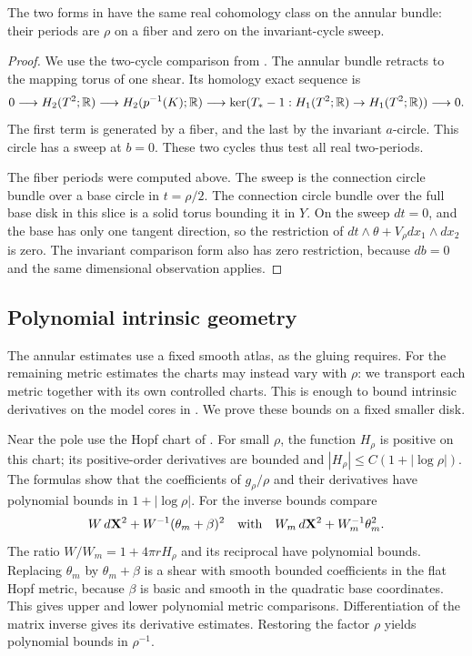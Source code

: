\begin{lemma}\label{lem:nodal-annular-periods}
The two forms in  have the same
real cohomology class on the annular bundle: their periods are
\(\rho\) on a fiber and zero on the invariant-cycle sweep.
\end{lemma}
\begin{proof}
We use the two-cycle comparison from
\cite[proof of Lemma~4.3]{GrossWilson2000}.
The annular bundle retracts to the mapping torus of one shear.
Its homology exact sequence is
\[
 0\longrightarrow H_2(T^2;\mathbb R)
 \longrightarrow H_2(p^{-1}(K);\mathbb R)
 \longrightarrow\ker(T_*-1:H_1(T^2;\mathbb R)\to H_1(T^2;\mathbb R))
 \longrightarrow0.
\]
The first term is generated by a fiber, and the last by the
invariant \(a\)-circle.  This circle has a sweep at \(b=0\).
These two cycles thus test all real two-periods.

The fiber periods were computed above.  The sweep is the
connection circle bundle over a base circle in \(t=\rho/2\).
The connection circle bundle over the full base disk in this
slice is a solid torus bounding it in \(Y\).
On the sweep \(dt=0\), and the base has only one tangent
direction, so the restriction of
\(dt\wedge\theta+V_\rho dx_1\wedge dx_2\) is zero.
The invariant comparison form also has zero restriction, because
\(db=0\) and the same dimensional observation applies.
\end{proof}

\subsection{Polynomial intrinsic geometry}

The annular estimates use a fixed smooth atlas, as the gluing requires.
For the remaining metric estimates the charts may instead vary with
\(\rho\): we transport each metric together with its own controlled
charts.  This is enough to bound intrinsic derivatives on the model
cores in .  We prove these bounds on a fixed
smaller disk.

Near the pole use the Hopf chart of .
For small \(\rho\), the function \(H_\rho\) is positive on this
chart; its positive-order derivatives are bounded and
\(|H_\rho|\le C(1+|\log\rho|)\).
The formulas  show that the
coefficients of \(g_\rho/\rho\) and their derivatives have
polynomial bounds in \(1+|\log\rho|\).
For the inverse bounds compare
\[
 W\,d\mathbf X^2+W^{-1}(\theta_m+\beta)^2
 \quad\hbox{with}\quad
 W_m\,d\mathbf X^2+W_m^{-1}\theta_m^2.
\]
The ratio \(W/W_m=1+4\pi rH_\rho\) and its reciprocal have
polynomial bounds.  Replacing \(\theta_m\) by
\(\theta_m+\beta\) is a shear with smooth bounded coefficients
in the flat Hopf metric, because \(\beta\) is basic and smooth
in the quadratic base coordinates.  This gives upper and lower
polynomial metric comparisons.  Differentiation of the matrix
inverse gives its derivative estimates.  Restoring the factor
\(\rho\) yields polynomial bounds in \(\rho^{-1}\).


